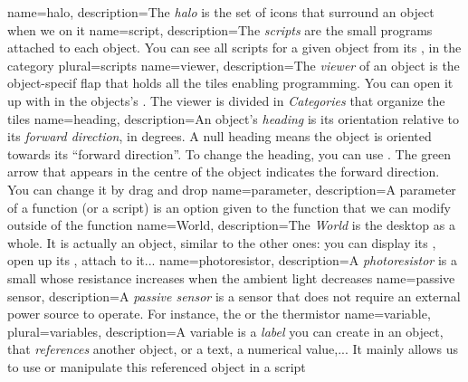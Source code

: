 

		{name={halo}, 
		description={The \emph{halo} is the set of icons that surround an object when we \rc on it}}
		{name={script}, 
		description={The \emph{scripts} are the small programs attached to each object. You can see all scripts for a given object from its , in the  category}
		plural={scripts}}
		{name={viewer}, 
		description={The \emph{viewer} of an object is the object-specif flap that holds all the tiles enabling programming. You can open it up with  in the objects's . The viewer is divided in \emph{Categories} that organize the tiles}}
		{name={heading}, 
		description={An object's \emph{heading} is its orientation relative to its \emph{forward direction}, in degrees. A null heading means the object is oriented towards its ``forward direction''. To change the heading, you can use . The green arrow that appears in the centre of the object indicates the forward direction. You can change it by drag and drop }}
		{name={parameter}, 
		description={A parameter of a function (or a script) is an option given to the function that we can modify outside of the function}}
		{name={World}, 
		description={The \emph{World} is the \appName desktop as a whole. It is actually an object, similar to the other ones: you can display its , open up its , attach  to it...}}
		{name={photoresistor}, 
		description={A \emph{photoresistor} is a small  whose resistance increases when the ambient light decreases}}
		{name={passive sensor}, 
		description={A \emph{passive sensor} is a sensor that does not require an external power source to operate. For instance, the  or the thermistor}}
		{name={variable}, 
		plural={variables}, 
		description={A variable is a \emph{label} you can create in an object, that \emph{references} another object, or a text, a numerical value,... It mainly allows us to use or manipulate this referenced object in a script}}
